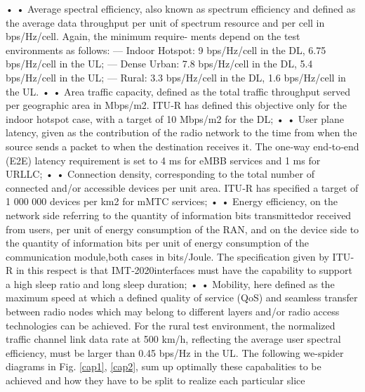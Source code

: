 \documentclass{article}
\begin{document}
• •
 Average spectral efficiency, also known as spectrum efficiency and defined as the average data
throughput per unit of spectrum resource and per cell in bps/Hz/cell. Again, the minimum require-
ments depend on the test environments as follows:
–– Indoor Hotspot: 9 bps/Hz/cell in the DL, 6.75 bps/Hz/cell in the UL;
–– Dense Urban: 7.8 bps/Hz/cell in the DL, 5.4 bps/Hz/cell in the UL;
–– Rural: 3.3 bps/Hz/cell in the DL, 1.6 bps/Hz/cell in the UL.
• •
 Area traffic capacity, defined as the total traffic throughput served per geographic area in Mbps/m2.
ITU‐R has defined this objective only for the indoor hotspot case, with a target of 10 Mbps/m2 for
the DL;
• •
 User plane latency, given as the contribution of the radio network to the time from when the
source sends a packet to when the destination receives it. The one‐way end‐to‐end (E2E) latency
requirement is set to 4 ms for eMBB services and 1 ms for URLLC;
• •
 Connection density, corresponding to the total number of connected and/or accessible devices
per unit area. ITU‐R has specified a target of 1 000 000 devices per km2 for mMTC services;
• •
 Energy efficiency, on the network side referring to the quantity of information bits transmittedor received from users, per unit of energy consumption of the RAN, and on the device side to the
quantity of information bits per unit of energy consumption of the communication module,both cases in bits/Joule. The specification given by ITU‐R in this respect is that IMT‐2020interfaces must have the capability to support a high sleep ratio and long sleep duration;
• •
 Mobility, here defined as the maximum speed at which a defined quality of service (QoS) and
seamless transfer between radio nodes which may belong to different layers and/or radio access
technologies can be achieved. For the rural test environment, the normalized traffic channel link
data rate at 500 km/h, reflecting the average user spectral efficiency, must be larger than 0.45 bps/Hz
in the UL.
The following we-spider diagrams in Fig. \ref{cap1}, \ref{cap2}, sum up optimally these capabalities to be achieved and how they have to be split to realize each particular slice
\end{document}
